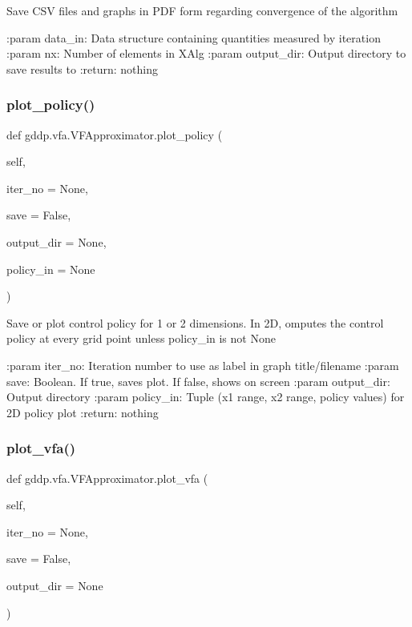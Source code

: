 \begin{DoxyVerb}Save CSV files and graphs in PDF form regarding convergence of the algorithm

:param data_in: Data structure containing quantities measured by iteration
:param nx: Number of elements in XAlg
:param output_dir: Output directory to save results to
:return: nothing
\end{DoxyVerb}
 \mbox{\label{classgddp_1_1vfa_1_1_v_f_approximator_a6dc19f7ef850e3568f3614abf1c6680c}} 
\subsubsection{\texorpdfstring{plot\_policy()}{plot\_policy()}}
{\footnotesize\ttfamily def gddp.\+vfa.\+V\+F\+Approximator.\+plot\+\_\+policy (\begin{DoxyParamCaption}\item[{}]{self,  }\item[{}]{iter\+\_\+no = {\ttfamily None},  }\item[{}]{save = {\ttfamily False},  }\item[{}]{output\+\_\+dir = {\ttfamily None},  }\item[{}]{policy\+\_\+in = {\ttfamily None} }\end{DoxyParamCaption})}

\begin{DoxyVerb}Save or plot control policy for 1 or 2 dimensions. In 2D, omputes the control policy at
every grid point unless policy_in is not None

:param iter_no: Iteration number to use as label in graph title/filename
:param save: Boolean. If true, saves plot. If false, shows on screen
:param output_dir: Output directory
:param policy_in: Tuple (x1 range, x2 range, policy values) for 2D policy plot
:return: nothing
\end{DoxyVerb}
 \mbox{\label{classgddp_1_1vfa_1_1_v_f_approximator_a29c731e88e000f0c991b7622f37a087d}} 
\subsubsection{\texorpdfstring{plot\_vfa()}{plot\_vfa()}}
{\footnotesize\ttfamily def gddp.\+vfa.\+V\+F\+Approximator.\+plot\+\_\+vfa (\begin{DoxyParamCaption}\item[{}]{self,  }\item[{}]{iter\+\_\+no = {\ttfamily None},  }\item[{}]{save = {\ttfamily False},  }\item[{}]{output\+\_\+dir = {\ttfamily None} }\end{DoxyParamCaption})}

